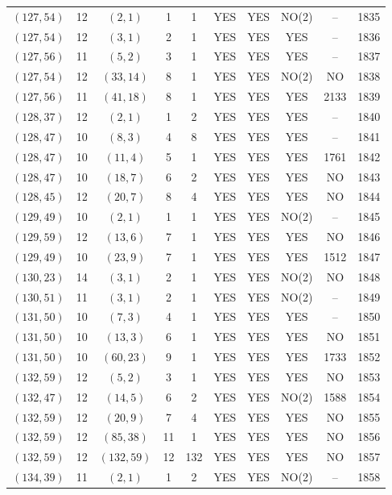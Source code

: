 \begin{longtable}{|c|c|c|c|c|c|c|c|c|c|}
$(127, 54)$ & 12 & $(2, 1)$ & 1 & 1 & YES & YES & NO(2) & -- & 1835\\
$(127, 54)$ & 12 & $(3, 1)$ & 2 & 1 & YES & YES & YES & -- & 1836\\
$(127, 56)$ & 11 & $(5, 2)$ & 3 & 1 & YES & YES & YES & -- & 1837\\
$(127, 54)$ & 12 & $(33, 14)$ & 8 & 1 & YES & YES & NO(2) & NO & 1838\\
$(127, 56)$ & 11 & $(41, 18)$ & 8 & 1 & YES & YES & YES & 2133 & 1839\\
$(128, 37)$ & 12 & $(2, 1)$ & 1 & 2 & YES & YES & YES & -- & 1840\\
$(128, 47)$ & 10 & $(8, 3)$ & 4 & 8 & YES & YES & YES & -- & 1841\\
$(128, 47)$ & 10 & $(11, 4)$ & 5 & 1 & YES & YES & YES & 1761 & 1842\\
$(128, 47)$ & 10 & $(18, 7)$ & 6 & 2 & YES & YES & YES & NO & 1843\\
$(128, 45)$ & 12 & $(20, 7)$ & 8 & 4 & YES & YES & YES & NO & 1844\\
$(129, 49)$ & 10 & $(2, 1)$ & 1 & 1 & YES & YES & NO(2) & -- & 1845\\
$(129, 59)$ & 12 & $(13, 6)$ & 7 & 1 & YES & YES & YES & NO & 1846\\
$(129, 49)$ & 10 & $(23, 9)$ & 7 & 1 & YES & YES & YES & 1512 & 1847\\
$(130, 23)$ & 14 & $(3, 1)$ & 2 & 1 & YES & YES & NO(2) & NO & 1848\\
$(130, 51)$ & 11 & $(3, 1)$ & 2 & 1 & YES & YES & NO(2) & -- & 1849\\
$(131, 50)$ & 10 & $(7, 3)$ & 4 & 1 & YES & YES & YES & -- & 1850\\
$(131, 50)$ & 10 & $(13, 3)$ & 6 & 1 & YES & YES & YES & NO & 1851\\
$(131, 50)$ & 10 & $(60, 23)$ & 9 & 1 & YES & YES & YES & 1733 & 1852\\
$(132, 59)$ & 12 & $(5, 2)$ & 3 & 1 & YES & YES & YES & NO & 1853\\
$(132, 47)$ & 12 & $(14, 5)$ & 6 & 2 & YES & YES & NO(2) & 1588 & 1854\\
$(132, 59)$ & 12 & $(20, 9)$ & 7 & 4 & YES & YES & YES & NO & 1855\\
$(132, 59)$ & 12 & $(85, 38)$ & 11 & 1 & YES & YES & YES & NO & 1856\\
$(132, 59)$ & 12 & $(132, 59)$ & 12 & 132 & YES & YES & YES & NO & 1857\\
$(134, 39)$ & 11 & $(2, 1)$ & 1 & 2 & YES & YES & NO(2) & -- & 1858\\

\end{longtable}
